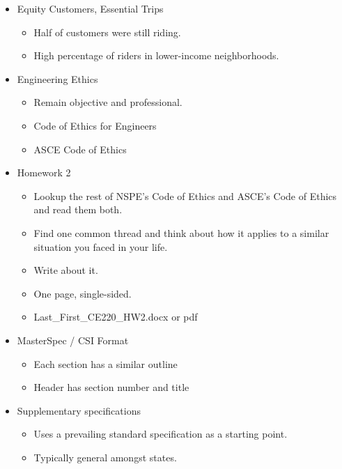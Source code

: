 \documentclass{article}
\begin{document}
\begin{itemize}
\begin{itemize}
    \end{itemize}
    \item Equity Customers, Essential Trips
    \begin{itemize}
        \item Half of customers were still riding.
        \item High percentage of riders in lower-income neighborhoods.
    \end{itemize}
    \item Engineering Ethics
    \begin{itemize}
        \item Remain objective and professional.
        \item Code of Ethics for Engineers
        \item ASCE Code of Ethics
    \end{itemize}
    \item Homework 2
    \begin{itemize}
        \item Lookup the rest of NSPE's Code of Ethics and ASCE's Code of Ethics and read them both.
        \item Find one common thread and think about how it applies to a similar situation you faced in your life.
        \item Write about it.
        \item One page, single-sided.
        \item Last\_First\_CE220\_HW2.docx or pdf
    \end{itemize}
    \item MasterSpec / CSI Format
    \begin{itemize}
        \item Each section has a similar outline
        \item Header has section number and title
    \end{itemize}
    \item Supplementary specifications
    \begin{itemize}
        \item Uses a prevailing standard specification as a starting point.
        \item Typically general amongst states.
    \end{itemize}
\end{itemize}
\end{document}
